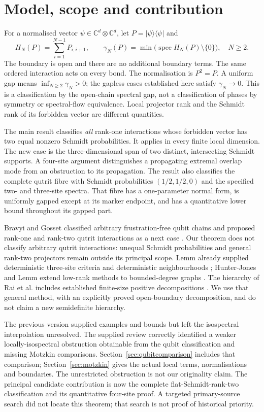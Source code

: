 \documentclass[11pt,a4paper]{article}
\theoremstyle{remark}\newtheorem{remark}[theorem]{Remark}
\newcommand{\C}{\mathbb C}
\newcommand{\ket}[1]{\lvert #1\rangle}
\newcommand{\bra}[1]{\langle #1\rvert}
\newcommand{\spec}{\operatorname{spec}}
\begin{document}
\section{Model, scope and contribution}\label{sec:scope}
For a normalised vector $\psi\in\C^d\otimes\C^d$, let $P=\ket\psi\bra\psi$ and
\begin{equation}\label{eq:HN}
 H_N(P)=\sum_{i=1}^{N-1}P_{i,i+1},\qquad
 \gamma_N(P)=\min\bigl(\spec H_N(P)\setminus\{0\}\bigr),\quad N\ge2.
\end{equation}
The boundary is open and there are no additional boundary terms. The same ordered interaction acts on every bond. The normalisation is $P^2=P$. A uniform gap means $\inf_{N\ge2}\gamma_N>0$; the gapless cases established here satisfy $\gamma_N\to0$. This is a classification by the open-chain spectral gap, not a classification of phases by symmetry or spectral-flow equivalence. Local projector rank and the Schmidt rank of its forbidden vector are different quantities.

The main result classifies \emph{all} rank-one interactions whose forbidden vector has two equal nonzero Schmidt probabilities. It applies in every finite local dimension. The new case is the three-dimensional span of two distinct, intersecting Schmidt supports. A four-site argument distinguishes a propagating extremal overlap mode from an obstruction to its propagation. The result also classifies the complete qutrit fibre with Schmidt probabilities $(1/2,1/2,0)$ and the specified two- and three-site spectra. That fibre has a one-parameter normal form, is uniformly gapped except at its marker endpoint, and has a quantitative lower bound throughout its gapped part.

Bravyi and Gosset classified arbitrary frustration-free qubit chains and proposed rank-one and rank-two qutrit interactions as a next case \cite{BG}. Our theorem does not classify arbitrary qutrit interactions: unequal Schmidt probabilities and general rank-two projectors remain outside its principal scope. Lemm already supplied deterministic three-site criteria and deterministic neighbourhoods \cite{Lemm}; Hunter-Jones and Lemm extend low-rank methods to bounded-degree graphs \cite{HJL}. The hierarchy of Rai et al. includes established finite-size positive decompositions \cite{Rai}. We use that general method, with an explicitly proved open-boundary decomposition, and do not claim a new semidefinite hierarchy.

The previous version supplied examples and bounds but left the isospectral interpolation unresolved. The supplied review correctly identified a weaker locally-isospectral obstruction obtainable from the qubit classification and missing Motzkin comparisons. Section~\ref{sec:qubitcomparison} includes that comparison; Section~\ref{sec:motzkin} gives the actual local terms, normalisations and boundaries. The unrestricted obstruction is not our originality claim. The principal candidate contribution is now the complete flat-Schmidt-rank-two classification and its quantitative four-site proof. A targeted primary-source search did not locate this theorem; that search is not proof of historical priority.
\end{document}
